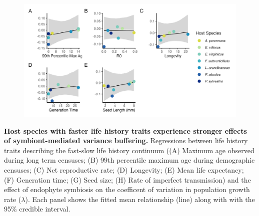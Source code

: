 \documentclass[12pt]{article}
\begin{document}
\begin{figure}
	\centering
	\includegraphics[width=\linewidth]{StochDemo_fig4.png}
\end{figure}
 \textbf{Host species with faster life history traits experience stronger effects of symbiont-mediated variance buffering.} Regressions between life history traits describing the fast-slow life history continuum ((A) Maximum age observed during long term censuses; (B) 99th percentile maximum age during demographic censuses; (C) Net reproductive rate; (D) Longevity; (E) Mean life expectancy; (F) Generation time; (G) Seed size; (H) Rate of imperfect transmission) and the effect of endophyte symbiosis on the coefficent of variation in population growth rate ($\lambda$). Each panel shows the fitted mean relationship (line) along with with the 95\% credible interval.
\newpage
\end{document}
